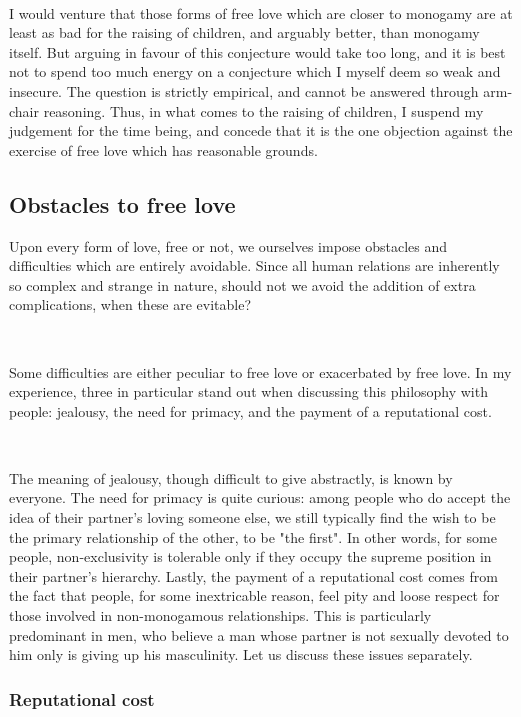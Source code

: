 \documentclass[a4paper, 12pt]{article}
\begin{document}
~

I would venture that those forms of free love which are closer to
monogamy are at least as bad for the raising of children, and arguably better,
than monogamy itself. But arguing in favour of this conjecture would take too
long, and it is best not to spend too much energy on a conjecture which I
myself deem so weak and insecure. The question is strictly empirical, and
cannot be answered through arm-chair reasoning. Thus, in what comes to the
raising of children, I suspend my judgement for the time being, and concede
that it is the one objection against the exercise of free love which has
reasonable grounds. 


\subsection{Obstacles to free love}


Upon every form of love, free or not, we ourselves impose obstacles and
difficulties which are entirely avoidable. Since all human relations are
inherently so complex and strange in nature, should not we avoid the addition 
of extra complications, when these are evitable?

~ 

Some difficulties are either peculiar to free love or exacerbated by free love.
In my experience, three in particular stand out when discussing this philosophy
with people: jealousy, the need for primacy, and the payment of a reputational
cost.

~ 

The meaning of jealousy, though difficult to give abstractly, is known by
everyone. The need for primacy is quite curious: among people who do accept the
idea of their partner's loving someone else, we still typically find the wish
to be the primary relationship of the other, to be "the first". In other words,
for some people, non-exclusivity is tolerable only if they occupy the supreme
position in their partner's hierarchy. Lastly, the payment of a reputational
cost comes from the fact that people, for some inextricable reason, feel pity
and loose respect for those involved in non-monogamous relationships. This is
particularly predominant in men, who believe a man whose partner is not
sexually devoted to him only is giving up his masculinity. Let us discuss these
issues separately. 

\subsubsection{Reputational cost}
\end{document}
